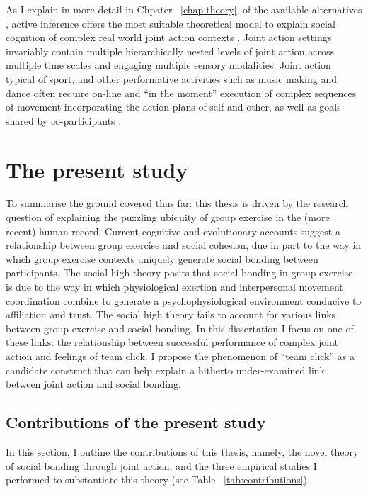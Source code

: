 \begin{CJK}{UTF8}{gbsn}
As I explain in more detail in Chpater ~\ref{chap:theory}, of the available alternatives \citep[see, for example,][]{Keller2016}, active inference offers the most suitable theoretical model to explain social cognition of complex real world joint action contexts \citep{Friston2015,Pesquita2017}.  Joint action settings invariably contain multiple hierarchically nested levels of joint action across multiple time scales and engaging multiple sensory modalities.  Joint action typical of sport, and other performative activities such as music making and dance often require on-line and ``in the moment'' execution of complex sequences of movement incorporating the action plans of self and other, as well as goals shared by co-participants \citep{Pesquita2017}.



\section{The present study\label{sect:presentStudy}}

To summarise the ground covered thus far: this thesis is driven by the research question of explaining the puzzling ubiquity of group exercise in the (more recent) human record. Current cognitive and evolutionary accounts suggest a relationship between group exercise and social cohesion, due in part to the way in which group exercise contexts uniquely generate social bonding between participants.  The social high theory posits that social bonding in group exercise is due to the way in which physiological exertion and interpersonal movement coordination combine to generate a psychophysiological environment conducive to affiliation and trust.  The social high theory fails to account for various links between group exercise and social bonding.  In this dissertation I focus on one of these links: the relationship between successful performance of complex joint action and feelings of team click.   I propose the phenomenon of ``team click'' as a candidate construct that can help explain a hitherto under-examined link between joint action and social bonding.


\subsection{Contributions of the present study\label{sect:contributions}}



In this section, I outline the contributions of this thesis, namely, the novel theory of social bonding through joint action, and the three empirical studies I performed to substantiate this theory (see Table ~\ref{tab:contributions}).



\end{CJK}

